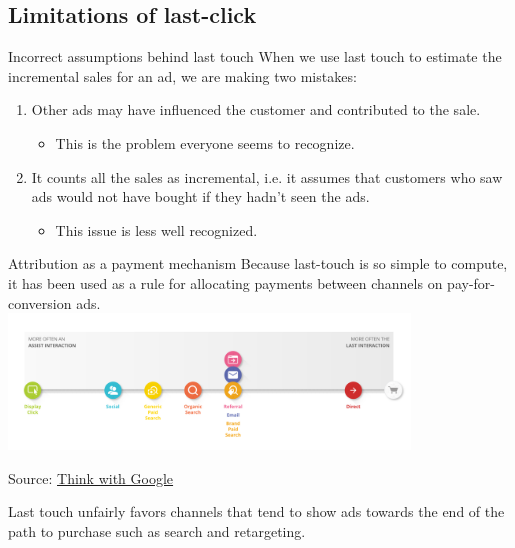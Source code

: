 \documentclass[10pt, aspectratio=169]{beamer}
\newcommand{\source}[1]{\begin{flushright} \footnotesize Source: {#1} \end{flushright} \normalsize}
\begin{document}
\subsection{Limitations of last-click} 


\begin{frame}{Incorrect assumptions behind last touch} 
When we use last touch to estimate the incremental sales for an ad, we are making two mistakes: 
\begin{enumerate}
\item Other ads may have influenced the customer and contributed to the sale.
\begin{itemize} 
\pause \item This is the problem everyone seems to recognize.
\end{itemize}
\pause \item It counts all the sales as incremental, i.e. it assumes that customers who saw ads would not have bought if they hadn't seen the ads.
\begin{itemize}
\pause \item This issue is less well recognized.
\end{itemize}
\end{enumerate}
\end{frame}

\begin{frame}{Attribution as a payment mechanism}
Because last-touch is so simple to compute, it has been used as a rule for allocating payments between channels on pay-for-conversion ads. \\
\includegraphics[width=0.8\textwidth]{images/pathtopurchase.png}
\source{\href{https://goo.gl/W3p5Tv}{Think with Google}}
\alert{Last touch unfairly favors channels that tend to show ads towards the end of the path to purchase such as search and retargeting.}
\end{frame}
\end{document}
